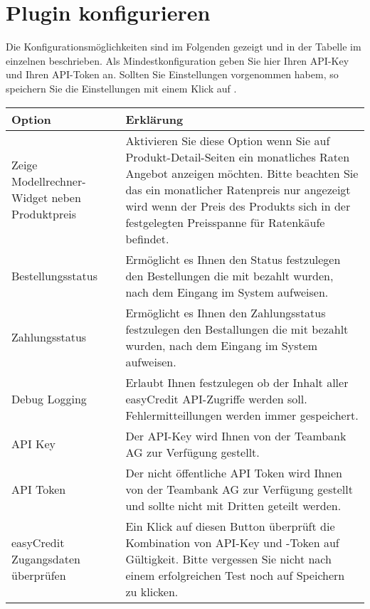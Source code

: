 \documentclass[a4paper,10pt,openany,oneside,ngerman]{sphinxmanual}
\begin{document}
\noindent{}


\section{Plugin konfigurieren}
\label{\detokenize{configuration:plugin-konfigurieren}}
Die Konfigurationsmöglichkeiten sind im Folgenden gezeigt und in der Tabelle im einzelnen beschrieben. Als Mindestkonfiguration geben Sie hier Ihren API-Key und Ihren API-Token an.
Sollten Sie Einstellungen vorgenommen habem, so speichern Sie die Einstellungen mit einem Klick auf .

\noindent{}


\begin{savenotes}\sphinxattablestart
\centering
\begin{tabulary}{\linewidth}[t]{|p{85pt}|J|}
\hline

Option
&
Erklärung
\\
\hline
Zeige Modellrechner-Widget neben Produktpreis
&
Aktivieren Sie diese Option wenn Sie auf Produkt-Detail-Seiten ein monatliches Raten Angebot anzeigen möchten. Bitte beachten Sie das ein monatlicher Ratenpreis nur angezeigt wird wenn der Preis des Produkts sich in der festgelegten Preisspanne für Ratenkäufe befindet.
\\
\hline
Bestellungsstatus
&
Ermöglicht es Ihnen den Status festzulegen den Bestellungen die mit  bezahlt wurden, nach dem Eingang im System aufweisen.
\\
\hline
Zahlungsstatus
&
Ermöglicht es Ihnen den Zahlungsstatus festzulegen den Bestallungen die mit  bezahlt wurden, nach dem Eingang im System aufweisen.
\\
\hline
Debug Logging
&
Erlaubt Ihnen festzulegen ob der Inhalt aller easyCredit API-Zugriffe werden soll. Fehlermitteillungen werden immer gespeichert.
\\
\hline
API Key
&
Der API-Key wird Ihnen von der Teambank AG zur Verfügung gestellt.
\\
\hline
API Token
&
Der nicht öffentliche API Token wird Ihnen von der Teambank AG zur Verfügung gestellt und sollte nicht mit Dritten geteilt werden.
\\
\hline
easyCredit Zugangsdaten überprüfen
&
Ein Klick auf diesen Button überprüft die Kombination von API-Key und -Token auf Gültigkeit. Bitte vergessen Sie nicht nach einem erfolgreichen Test noch auf Speichern zu klicken.
\\
\hline
\end{tabulary}
\par
\sphinxattableend\end{savenotes}
\end{document}

